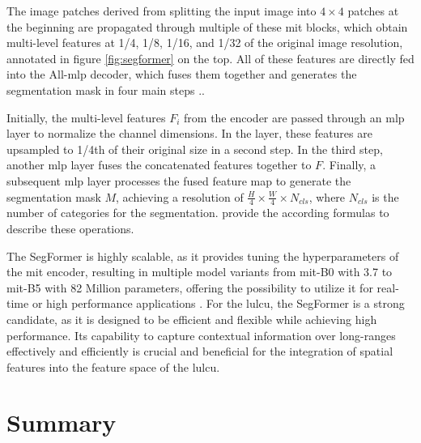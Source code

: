 The image patches derived from splitting the input image into \( 4 \times 4 \) patches at the beginning are propagated through multiple of these \gls{mit} blocks, which obtain multi-level features at 1/4, 1/8, 1/16, and 1/32 of the original image resolution, annotated in figure \ref{fig:segformer} on the top. All of these features are directly fed into the All-\gls{mlp} decoder, which fuses them together and generates the segmentation mask in four main steps \autocite{Lin.Cheng.ea2023,Xie.Wang.ea2021}..

Initially, the multi-level features \( F_i \) from the encoder are passed through an \gls{mlp} layer to normalize the channel dimensions. In the layer, these features are upsampled to 1/4th of their original size in a second step. In the third step, another \gls{mlp} layer fuses the concatenated features together to \( F \). Finally, a subsequent \gls{mlp} layer processes the fused feature map to generate the segmentation mask \( M \), achieving a resolution of \( \frac{H}{4} \times \frac{W}{4} \times N_{cls} \), where \( N_{cls} \) is the number of categories for the segmentation. \textcite{Lin.Cheng.ea2023,Wang.Wang.ea2023,Xie.Wang.ea2021} provide the according formulas to describe these operations.

The SegFormer is highly scalable, as it provides tuning the hyperparameters of the \gls{mit} encoder, resulting in multiple model variants from \gls{mit}-B0 with 3.7 to \gls{mit}-B5 with 82 Million parameters, offering the possibility to utilize it for real-time or high performance applications \autocite{Xie.Wang.ea2021}. For the \gls{lulcu}, the SegFormer is a strong candidate, as it is designed to be efficient and flexible while achieving high performance. Its capability to capture contextual information over long-ranges effectively and efficiently is crucial and beneficial for the integration of spatial features into the feature space of the \gls{lulcu}.

\section{Summary}

